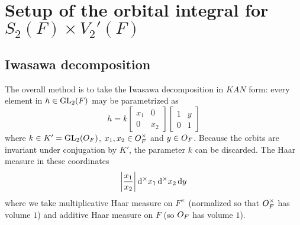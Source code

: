 \chapter{Setup of the orbital integral for $S_2(F) \times V_2'(F)$}
\label{ch:orbitalFJ1}

\section{Iwasawa decomposition}
The overall method is to take the Iwasawa decomposition in $KAN$ form:
every element in $h \in \operatorname{GL}_2(F)$ may be parametrized as
\[ h = k \begin{bmatrix} x_1 & 0 \\ 0 & x_2 \end{bmatrix}
  \begin{bmatrix} 1 & y \\ 0 & 1 \end{bmatrix} \]
where $k \in K' = \operatorname{GL}_2(O_F)$, $x_1, x_2 \in O_F^\times$ and $y \in O_F$.
Because the orbits are invariant under conjugation by $K'$,
the parameter $k$ can be discarded.
The Haar measure in these coordinates
\[ \left\lvert \frac{x_1}{x_2} \right\rvert \odif[\times] x_1 \odif[\times] x_2 \odif y \]
where we take multiplicative Haar measure on $F^\times$
(normalized so that $O_F^\times$ has volume $1$)
and additive Haar measure on $F$ (so $O_F$ has volume $1$).

